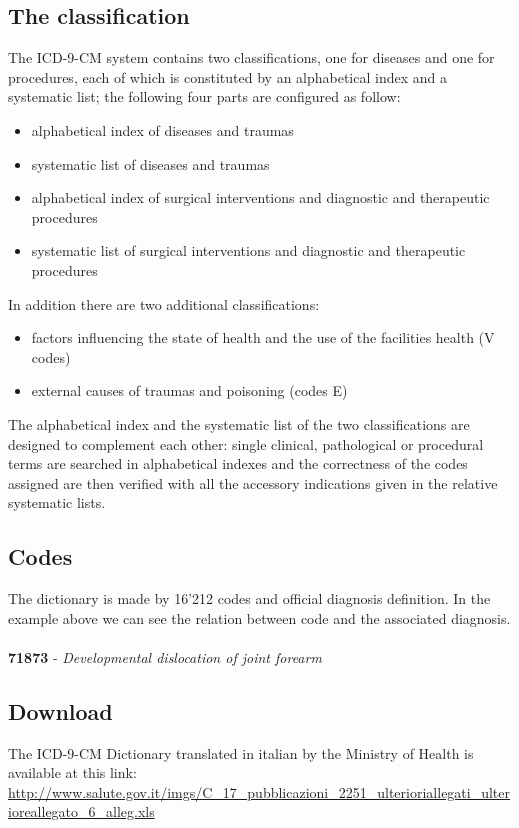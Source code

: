 \subsection{The classification}
The ICD-9-CM system contains two classifications, one for diseases and one for procedures, each of which is constituted by an alphabetical index and a systematic list; the following four parts are configured as follow:
\begin{itemize}
	\item alphabetical index of diseases and traumas
	\item systematic list of diseases and traumas
	\item alphabetical index of surgical interventions and diagnostic and therapeutic procedures
	\item systematic list of surgical interventions and diagnostic and therapeutic procedures
\end{itemize}
In addition there are two additional classifications:
\begin{itemize}
	\item factors influencing the state of health and the use of the facilities health (V codes)
	\item external causes of traumas and poisoning (codes E)
\end{itemize}
The alphabetical index and the systematic list of the two classifications are designed to complement each other: single clinical, pathological or procedural terms are searched in alphabetical indexes and the correctness of the codes assigned are then verified with all the accessory indications given in the relative systematic lists.

\subsection{Codes}

The dictionary is made by 16'212 codes and official diagnosis definition. In the example above %
we can see the relation between code and the associated diagnosis.
\\\\
\indent \textbf{71873} - \textit{Developmental dislocation of joint forearm}
\subsection{Download}
The ICD-9-CM Dictionary translated in italian by the Ministry of Health is available at this link: \url{http://www.salute.gov.it/imgs/C\_17\_pubblicazioni\_2251\_ulterioriallegati\_ulterioreallegato\_6\_alleg.xls}

